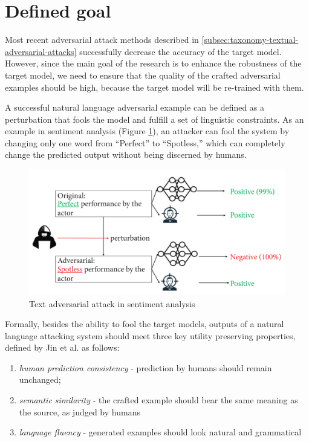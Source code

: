 \section{Defined goal}\label{sec:defined-goal}

Most recent adversarial attack methods described in \ref{subsec:taxonomy-textual-adversarial-attacks} successfully decrease the accuracy of the target model.
However, since the main goal of the research is to enhance the robustness of the target model, we need to ensure that the quality of the crafted adversarial examples should be high, because the target model will be re-trained with them.

A successful natural language adversarial example can be defined as a perturbation that fools the model and fulfill a set of linguistic constraints.
As an example in sentiment analysis (Figure \ref{fig:3_adverarial_example}), an attacker can fool the system by changing only one word from “Perfect” to “Spotless,” which can completely change the predicted output without being discerned by humans.

\begin{figure}[h]
    \centering
    \includegraphics[width=0.7\linewidth]{images/3_adversarial_attack.png}
    \caption{Text adversarial attack in sentiment analysis \cite{10.1155/2022/6458488}}
    \label{fig:3_adverarial_example}
\end{figure}

Formally, besides the ability to fool the target models, outputs of a natural language attacking system should meet three key utility preserving properties, defined by Jin et al. \cite{journals/corr/abs-1907-11932} as follows:
\begin{enumerate}
    \item \emph{human prediction consistency} - prediction by humans should remain unchanged;
    \item \emph{semantic similarity} -  the crafted example should bear the same meaning as the source, as judged by humans
    \item \emph{language fluency} - generated examples should look natural and grammatical
\end{enumerate}



